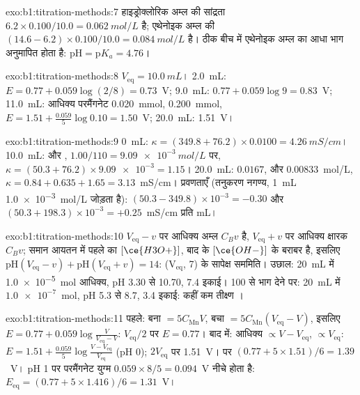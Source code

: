 \begin{solution}{exo:b1:titration-methods:7}
हाइड्रोक्लोरिक अम्ल की सांद्रता $6.2 \times 0.100/10.0 = \qty{0.062}{mol/L}$ है; एथेनोइक
अम्ल की $(14.6 - 6.2) \times 0.100/10.0 = \qty{0.084}{mol/L}$ है। ठीक बीच में
एथेनोइक अम्ल का आधा भाग अनुमापित होता है: $\mathrm{pH} = \mathrm{p}K_a = 4.76$।
\end{solution}

\begin{solution}{exo:b1:titration-methods:8}
$V_{\mathrm{eq}} = \qty{10.0}{mL}$। 2.0~mL: $E = 0.77 + 0.059\log(2/8) =
0.73$~V; 9.0~mL: $0.77 + 0.059\log 9 = 0.83$~V; 11.0~mL: आधिक्य
परमैंगनेट \qty{0.020}{mmol},  \qty{0.200}{mmol}, $E = 1.51 +
\frac{0.059}{5}\log 0.10 = 1.50$~V; 20.0~mL: 1.51~V।
\end{solution}

\begin{solution}{exo:b1:titration-methods:9}
0~mL: $\kappa = (349.8 + 76.2) \times 0.0100 = \qty{4.26}{mS/cm}$।
10.0~mL:  और , $1.00/110 = \qty{9.09e-3}{mol/L}$ पर,
$\kappa = (50.3 + 76.2) \times \num{9.09e-3} = 1.15$। 20.0~mL: 
$0.0167$,  और  $0.00833$~mol/L, $\kappa = 0.84 + 0.635 + 1.65
= 3.13$~mS/cm। प्रवणताएँ (तनुकरण नगण्य, \qty{1}{mL}
\qty{1.0e-3}{mol/L} जोड़ता है): $(50.3 - 349.8) \times 10^{-3} = -0.30$ और
$(50.3 + 198.3) \times 10^{-3} = +0.25$~mS/cm प्रति mL।
\end{solution}

\begin{solution}{exo:b1:titration-methods:10}
$V_{\mathrm{eq}} - v$ पर आधिक्य अम्ल $C_Bv$ है, $V_{\mathrm{eq}} + v$ पर
आधिक्य क्षारक $C_Bv$; समान आयतन में पहले का $[\ce{H3O+}]$, बाद के
$[\ce{OH-}]$ के बराबर है, इसलिए $\mathrm{pH}(V_{\mathrm{eq}} - v) +
\mathrm{pH}(V_{\mathrm{eq}} + v) = 14$: (V$_{\mathrm{eq}}$,
7) के सापेक्ष सममिति। उछाल: \qty{20}{mL} में \qty{1.0e-5}{mol} आधिक्य, pH 3.30 से 10.70, 7.4
इकाई। 100 से भाग देने पर: \qty{20}{mL} में $\num{1.0e-7}$~mol, pH 5.3 से 8.7,
3.4 इकाई: कहीं कम तीक्ष्ण ।
\end{solution}

\begin{solution}{exo:b1:titration-methods:11}
पहले: बना  $= 5C_{\mathrm{Mn}}V$, बचा  $=
5C_{\mathrm{Mn}}(V_{\mathrm{eq}} - V)$, इसलिए $E = 0.77 + 0.059\log\frac{V}{V_{\mathrm{eq}}
- V}$: $V_{\mathrm{eq}}/2$ पर $E = 0.77$। बाद में: आधिक्य  $\propto
V - V_{\mathrm{eq}}$,  $\propto V_{\mathrm{eq}}$: $E = 1.51 +
\frac{0.059}{5}\log\frac{V - V_{\mathrm{eq}}}{V_{\mathrm{eq}}}$ (pH 0);
$2V_{\mathrm{eq}}$ पर 1.51~V।  पर $(0.77 + 5 \times 1.51)/6 =
1.39$~V। pH 1 पर परमैंगनेट युग्म $0.059 \times 8/5 =
0.094$~V नीचे होता है: $E_{\mathrm{eq}} = (0.77 + 5 \times 1.416)/6 = 1.31$~V।
\end{solution}


